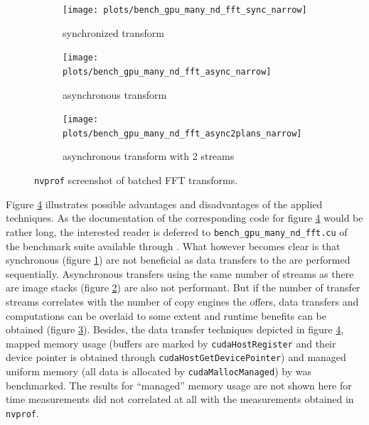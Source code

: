 \begin{figure}[h]
  \centering

  \begin{subfigure}[b]{0.9\textwidth}
    \texttt{[image: plots/bench\_gpu\_many\_nd\_fft\_sync\_narrow]}
    \caption{synchronized transform}
    \label{fig:batched_fft_sync}
  \end{subfigure}%

  \begin{subfigure}[b]{0.9\textwidth}
    \texttt{[image: plots/bench\_gpu\_many\_nd\_fft\_async\_narrow]}
    \caption{asynchronous transform}
    \label{fig:batched_fft_async}
  \end{subfigure}%

  \begin{subfigure}[b]{0.9\textwidth}
    \texttt{[image: plots/bench\_gpu\_many\_nd\_fft\_async2plans\_narrow]}
    \caption{asynchronous transform with 2 streams}
    \label{fig:batched_fft_async2plans}
  \end{subfigure}%

  \caption{\texttt{nvprof} screenshot of batched FFT transforms.}
  \label{fig:nvprof_batched_fft}
\end{figure}

Figure \ref{fig:nvprof_batched_fft} illustrates possible advantages and disadvantages of the applied techniques. As the documentation of the corresponding code for figure \ref{fig:nvprof_batched_fft} would be rather long, the interested reader is deferred to \texttt{bench_gpu_many_nd_fft.cu} of the \lmvn{} benchmark suite available through \cite{lmvn_repo}. What however becomes clear is that synchronous (figure \ref{fig:batched_fft_sync}) are not beneficial as data transfers to the \gpu{} are performed sequentially. Asynchronous transfers using the same number of streams as there are image stacks (figure \ref{fig:batched_fft_async}) are also not performant. But if the number of transfer streams correlates with the number of copy engines the \gpu{} offers, data transfers and computations can be overlaid to some extent and runtime benefits can be obtained (figure \ref{fig:batched_fft_async2plans}). Besides, the data transfer techniques depicted in figure \ref{fig:nvprof_batched_fft}, mapped memory usage (buffers are marked by \texttt{cudaHostRegister} and their device pointer is obtained through \texttt{cudaHostGetDevicePointer}) and managed uniform memory (all data is allocated by \texttt{cudaMallocManaged}) by \cufft{}  was benchmarked. The results for ``managed'' memory usage are not shown here for time measurements did not correlated at all with the measurements obtained in \texttt{nvprof}. 

